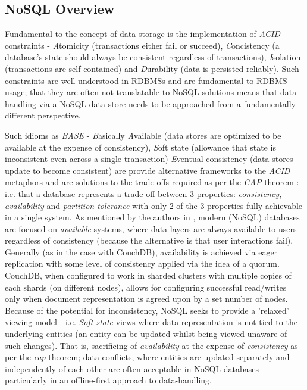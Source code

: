 \subsection{NoSQL Overview}
Fundamental to the concept of data storage is the implementation of \textit{ACID} constraints - \textit{A}tomicity (transactions either fail or succeed), \textit{C}oncistency (a database's state should always be consistent regardless of transactions), \textit{I}solation (transactions are self-contained) and \textit{D}urability (data is persisted reliably). Such constraints are well understood in RDBMSs and are fundamental to RDBMS usage; that they are often not translatable to NoSQL solutions means that data-handling via a NoSQL data store needs to be approached from a fundamentally different perspective.

Such idioms as \textit{BASE} - \textit{B}asically \textit{A}vailable (data stores are optimized to be available at the expense of consistency), \textit{S}oft state (allowance that state is inconsistent even across a single transaction) \textit{E}ventual consistency (data stores update to become consistent) are provide alternative frameworks to the \textit{ACID} metaphors and are solutions to the trade-offs required as per the \textit{CAP} theorem \cite{GANESHCHANDRA201513}: i.e. that a database represents a trade-off between 3 properties: \textit{consistency}, \textit{availability} and \textit{partition tolerance} with only 2 of the 3 properties fully achievable in a single system. As mentioned by the authors in \cite{GANESHCHANDRA201513}, modern (NoSQL) databases are focused on \textit{available} systems, where data layers are always available to users regardless of consistency (because the alternative is that user interactions fail). Generally (as in the case with CouchDB), availability is achieved via eager replication with some level of consistency applied via the idea of a quorum. CouchDB, when configured to work in sharded clusters with multiple copies of each shards (on different nodes), allows for configuring successful read/writes only when document representation is agreed upon by a set number of nodes. Because of the potential for inconsistency, NoSQL seeks to provide a 'relaxed' viewing model - i.e. \textit{Soft state} views where data representation is not tied to the underlying entities (an entity can be updated whilst being viewed unaware of such changes). That is, sacrificing of \textit{availability} at the expense of \textit{consistency} as per the \textit{cap} theorem; data conflicts, where entities are updated separately and independently of each other are often acceptable in NoSQL databases - particularly in an offline-first approach to data-handling.

